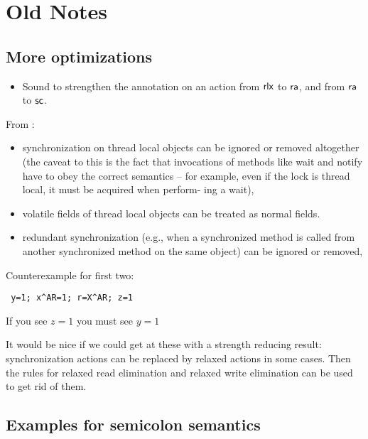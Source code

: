 % 
% 
% 


\section{Old Notes}

\subsection{More optimizations}

\begin{itemize}
\item Sound to strengthen the annotation on an action from ${\mathsf{rlx}}$ to
  ${\mathsf{ra}}$, and from ${\mathsf{ra}}$ to ${\mathsf{sc}}$.
\end{itemize}

From \cite{Manson:2005:JMM:1047659.1040336}:
\begin{itemize}
\item synchronization on thread local objects can be ignored or removed
  altogether (the caveat to this is the fact that invocations of methods like
  wait and notify have to obey the correct semantics – for example, even if
  the lock is thread local, it must be acquired when perform- ing a wait),
  
\item volatile fields of thread local objects can be treated as normal
  fields.

\item redundant synchronization (e.g., when a synchronized method is called
  from another synchronized method on the same object) can be ignored or
  removed,
  
\end{itemize}

Counterexample for first two:
\begin{verbatim}
 y=1; x^AR=1; r=X^AR; z=1
\end{verbatim}
If you see $z=1$ you must see $y=1$

It would be nice if we could get at these with a strength reducing result:
synchronization actions can be replaced by relaxed actions in some cases.
Then the rules for relaxed read elimination and relaxed write elimination can
be used to get rid of them.

\subsection{Examples for semicolon semantics}

